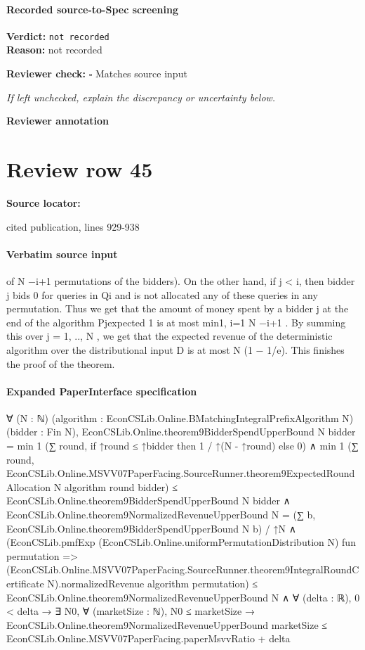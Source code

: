 \documentclass[10pt]{article}
\newcommand{\reviewerbox}{%
  \par\noindent\fbox{\parbox{0.96\linewidth}{\rule{0pt}{0.38in}}}\par
}
\newcommand{\reviewmatch}[1]{%
  \par\noindent\textbf{Reviewer check:} $\square$\; #1\par
  \noindent\emph{If left unchecked, explain the discrepancy or uncertainty below.}\par
}
\begin{document}
\paragraph{Recorded source-to-Spec screening}
\textbf{Verdict:} \texttt{not recorded}
\\
\textbf{Reason:} not recorded
\reviewmatch{Matches source input}
\noindent\textbf{Reviewer annotation}\par
\reviewerbox
\clearpage
\hypertarget{source-claim-264773c8f10d4b54}{}
\section*{Review row 45}
\textbf{Source locator:} {\footnotesize\raggedright cited publication, lines 929-\allowbreak{}938\par}
\paragraph{Verbatim source input}
\begin{ReviewVerbatim}
of N −i+1
permutations of the bidders). On the other hand, if j < i, then bidder j bids 0 for queries in
Qi and is not allocated any of these queries in any permutation.
Thus we get that the
amount of money spent by a bidder j at the end of the algorithm
Pjexpected
1
is at most min{1, i=1 N −i+1 }. By summing this over j = 1, .., N , we get that the expected
revenue of the deterministic algorithm over the distributional input D is at most N (1 − 1/e).
This finishes the proof of the theorem.
\end{ReviewVerbatim}


\paragraph{Expanded PaperInterface specification}
\begin{ReviewVerbatim}
∀ (N : ℕ) (algorithm : EconCSLib.Online.BMatchingIntegralPrefixAlgorithm N) (bidder : Fin N),
  EconCSLib.Online.theorem9BidderSpendUpperBound N bidder =
      min 1 (∑ round, if ↑round ≤ ↑bidder then 1 / ↑(N - ↑round) else 0) ∧
    min 1
          (∑ round,
            EconCSLib.Online.MSVV07PaperFacing.SourceRunner.theorem9ExpectedRoundAllocation N algorithm round bidder) ≤
        EconCSLib.Online.theorem9BidderSpendUpperBound N bidder ∧
      EconCSLib.Online.theorem9NormalizedRevenueUpperBound N =
          (∑ b, EconCSLib.Online.theorem9BidderSpendUpperBound N b) / ↑N ∧
        (EconCSLib.pmfExp (EconCSLib.Online.uniformPermutationDistribution N) fun permutation =>
              (EconCSLib.Online.MSVV07PaperFacing.SourceRunner.theorem9IntegralRoundCertificate N).normalizedRevenue
                algorithm permutation) ≤
            EconCSLib.Online.theorem9NormalizedRevenueUpperBound N ∧
          ∀ (delta : ℝ),
            0 < delta →
              ∃ N0,
                ∀ (marketSize : ℕ),
                  N0 ≤ marketSize →
                    EconCSLib.Online.theorem9NormalizedRevenueUpperBound marketSize ≤
                      EconCSLib.Online.MSVV07PaperFacing.paperMsvvRatio + delta
\end{ReviewVerbatim}
\end{document}
